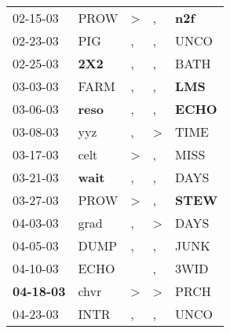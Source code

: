 \begin{supertabular}{p{0.07\textwidth}p{0.06\textwidth}p{0.02\textwidth}p{0.02\textwidth}p{0.06\textwidth}}
          02-15-03\textsuperscript{} &           PROW\textsuperscript{} &     \textgreater &                , &   \textbf{n2f\textsuperscript{}} \\
          02-23-03\textsuperscript{} &            PIG\textsuperscript{} &                , &                , &           UNCO\textsuperscript{} \\
          02-25-03\textsuperscript{} &   \textbf{2X2\textsuperscript{}} &                , &                , &           BATH\textsuperscript{} \\
          03-03-03\textsuperscript{} &           FARM\textsuperscript{} &                , &                , &   \textbf{LMS\textsuperscript{}} \\
          03-06-03\textsuperscript{} &  \textbf{reso\textsuperscript{}} &                , &                , &  \textbf{ECHO\textsuperscript{}} \\
          03-08-03\textsuperscript{} &            yyz\textsuperscript{} &                , &     \textgreater &           TIME\textsuperscript{} \\
          03-17-03\textsuperscript{} &           celt\textsuperscript{} &     \textgreater &                , &           MISS\textsuperscript{} \\
          03-21-03\textsuperscript{} &  \textbf{wait\textsuperscript{}} &                , &                , &           DAYS\textsuperscript{} \\
          03-27-03\textsuperscript{} &           PROW\textsuperscript{} &     \textgreater &                , &  \textbf{STEW\textsuperscript{}} \\
          04-03-03\textsuperscript{} &           grad\textsuperscript{} &                , &     \textgreater &           DAYS\textsuperscript{} \\
          04-05-03\textsuperscript{} &           DUMP\textsuperscript{} &                , &                , &           JUNK\textsuperscript{} \\
          04-10-03\textsuperscript{} &           ECHO\textsuperscript{} &                  &                , &           3WID\textsuperscript{} \\
 \textbf{04-18-03\textsuperscript{}} &           chvr\textsuperscript{} &     \textgreater &     \textgreater &           PRCH\textsuperscript{} \\
          04-23-03\textsuperscript{} &           INTR\textsuperscript{} &                , &                , &           UNCO\textsuperscript{} \\

\end{supertabular}

